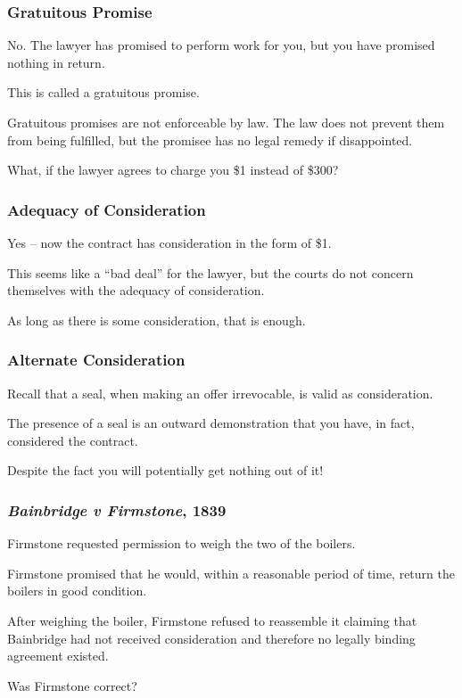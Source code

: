 \begin{frame}
\frametitle{Gratuitous Promise}

No. The lawyer has promised to perform work for you, but you have promised nothing in return.

This is called a \alert{gratuitous promise}. 

Gratuitous promises are not enforceable by law. The law does not prevent them from being fulfilled, but the promisee has no legal remedy if disappointed.

What, if the lawyer agrees to charge you \$1 instead of \$300?

\end{frame}



\begin{frame}
\frametitle{Adequacy of Consideration}

Yes -- now the contract has consideration in the form of \$1.

This seems like a ``bad deal'' for the lawyer, but the courts do not concern themselves with the adequacy of consideration.

As long as there is some consideration, that is enough.

\end{frame}



\begin{frame}
\frametitle{Alternate Consideration}

Recall that a seal, when making an offer irrevocable, is valid as consideration.

The presence of a seal is an outward demonstration that you have, in fact, considered the contract.

Despite the fact you will potentially get nothing out of it!

\end{frame}



\begin{frame}
\frametitle{\textit{Bainbridge v Firmstone}, 1839}

Firmstone requested permission to weigh the two of the boilers.  

Firmstone promised that he would, within a reasonable period of time, return the boilers in good condition.

After weighing the boiler, Firmstone refused to reassemble it claiming that Bainbridge had not received consideration and therefore no legally binding agreement existed.

Was Firmstone correct?

\end{frame}



